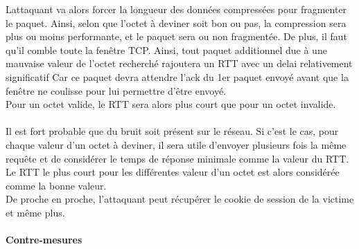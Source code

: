 Lattaquant va alors forcer la longueur des données compressées pour fragmenter le paquet. Ainsi, selon que l'octet à deviner soit bon ou pas, la compression sera plus ou moins performante, et le paquet sera ou non fragmentée. De plus, il faut qu'il comble toute la fenêtre TCP. Ainsi, tout paquet additionnel due à une mauvaise valeur de l'octet recherché rajoutera un RTT avec un delai relativement significatif Car ce paquet devra attendre l'ack du 1er paquet envoyé avant que la fenêtre ne coulisse pour lui permettre d'être envoyé.\\

Pour un octet valide, le RTT sera alors plus court que pour un octet invalide.

\paragraph{}
Il est fort probable que du bruit soit présent sur le réseau. Si c'est le cas, pour chaque valeur d'un octet à deviner, il sera utile d'envoyer plusieurs fois la même requête et de considérer le temps de réponse minimale comme la valeur du RTT. Le RTT le plus court pour les différentes valeur d'un octet est alors considérée comme la bonne valeur.\\

De proche en proche, l'attaquant peut récupérer le cookie de session de la victime et même plus.

\paragraph{Contre-mesures}


